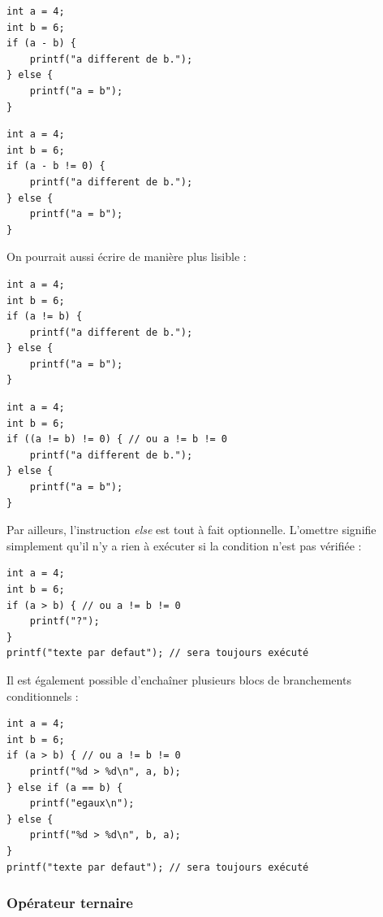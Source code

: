 \documentclass[../../../main.tex]{subfiles}
\begin{document}
\begin{minipage}{0.5\textwidth}
\begin{verbatim}
int a = 4;
int b = 6;
if (a - b) {
	printf("a different de b.");
} else {
	printf("a = b");
}
\end{verbatim}
\end{minipage}
\begin{minipage}{0.5\textwidth}
\begin{verbatim}
int a = 4;
int b = 6;
if (a - b != 0) {
	printf("a different de b.");
} else {
	printf("a = b");
}
\end{verbatim}
\end{minipage}
 
On pourrait aussi écrire de manière plus lisible : 
 
\begin{minipage}{0.5\textwidth}
\begin{verbatim}
int a = 4;
int b = 6;
if (a != b) {
	printf("a different de b.");
} else {
	printf("a = b");
}
\end{verbatim}
\end{minipage}
\begin{minipage}{0.5\textwidth}
\begin{verbatim}
int a = 4;
int b = 6;
if ((a != b) != 0) { // ou a != b != 0
	printf("a different de b.");
} else {
	printf("a = b");
}
\end{verbatim}
\end{minipage}
 
Par ailleurs, l'instruction \textit{else} est tout à fait optionnelle. L'omettre signifie simplement qu'il n'y a rien à exécuter si la condition n'est pas vérifiée :
\begin{verbatim}
int a = 4;
int b = 6;
if (a > b) { // ou a != b != 0
	printf("?");
}
printf("texte par defaut"); // sera toujours exécuté
\end{verbatim}
Il est également possible d'enchaîner plusieurs blocs de branchements conditionnels :
\begin{verbatim}
int a = 4;
int b = 6;
if (a > b) { // ou a != b != 0
	printf("%d > %d\n", a, b);
} else if (a == b) {
	printf("egaux\n");
} else {
	printf("%d > %d\n", b, a);
}
printf("texte par defaut"); // sera toujours exécuté
\end{verbatim}
\subsubsection{Opérateur ternaire}
 
\end{document}
